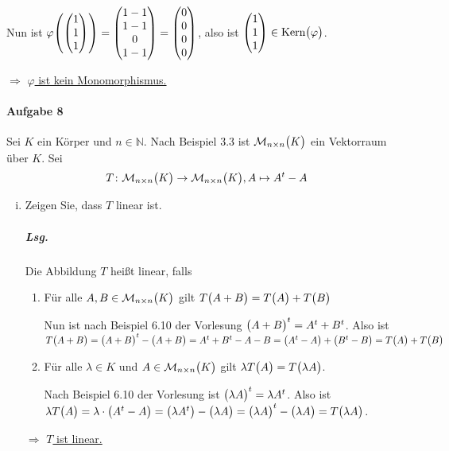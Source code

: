 \documentclass{scrreprt}
\newcommand\Kern{\text{Kern}}
\begin{document}
Nun ist $\varphi\qty(
  \begin{pmatrix} 1 \\ 1 \\ 1 \end{pmatrix}
) = \begin{pmatrix} 1 - 1 \\ 1 - 1 \\ 0 \\ 1 - 1 \end{pmatrix}
= \begin{pmatrix} 0 \\ 0 \\ 0 \\ 0 \end{pmatrix}$, also ist
$\begin{pmatrix} 1 \\ 1 \\ 1 \end{pmatrix} \in \Kern\qty\big(\varphi)$.

$\Rightarrow$ \underline{$\varphi$ ist kein Monomorphismus.}

\newpage
\paragraph{Aufgabe 8} Sei $K$ ein Körper und $n \in \mathbb{N}$.
Nach Beispiel 3.3 ist $\mathcal{M}_{n \times n}\qty\big(K)$ ein
Vektorraum über $K$.
Sei
\[
  T \colon \mathcal{M}_{n \times n} \qty\big(K) \to
  \mathcal{M}_{n \times n} \qty\big(K), A \mapsto A^t - A
\]
\begin{enumerate}[(i)]
\item Zeigen Sie, dass $T$ linear ist.
  \subparagraph{Lsg.} Die Abbildung $T$ heißt linear, falls
  \begin{enumerate}[(1)]
  \item Für alle $A, B \in \mathcal{M}_{n \times n} \qty\big(K)$ gilt
    $T\qty\big(A + B) = T\qty\big(A) + T\qty\big(B)$

    Nun ist nach Beispiel 6.10 der Vorlesung $\qty\big(A + B)^t = A^t + B^t$.
    Also ist $T\qty\big(A + B) = \qty\big(A + B)^t - \qty\big(A + B)
    = A^t + B^t - A - B = \qty\big(A^t - A) + \qty\big(B^t - B)
    = T\qty\big(A) + T\qty\big(B)$

  \item Für alle $\lambda \in K$ und $A \in \mathcal{M}_{n \times n} \qty\big(K)$
    gilt $\lambda T\qty\big(A) = T\qty\big(\lambda A)$.

    Nach Beispiel 6.10 der Vorlesung ist $\qty\big(\lambda A)^t = \lambda A^t$.
    Also ist \\
    $\lambda T\qty\big(A) = \lambda \cdot \qty\big(A^t - A)
    = \qty\big(\lambda A^t) - \qty\big(\lambda A)
    = \qty\big(\lambda A)^t - \qty\big(\lambda A) = T\qty\big(\lambda A)$.
  \end{enumerate}

  $\Rightarrow$ \underline{$T$ ist linear.}
\end{enumerate}
\end{document}
